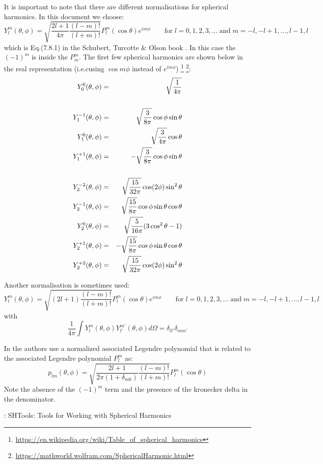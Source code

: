 It is important to note that there are different normalisations for spherical harmonics.
In this document we choose:
\begin{equation}
\boxed{
Y_l^m(\theta,\phi) = \sqrt{\frac{2l+1}{4\pi} \frac{(l-m)!}{(l+m)!}} P_l^m(\cos\theta) e^{im\phi}
}
\qquad 
\textrm{for} \; l=0,1,2,3,... \; \textrm{and} \; m=-l,-l+1,...,l-1,l
\label{eq:spha6}
\end{equation}
which is Eq.(7.8.1) in the Schubert, Turcotte \& Olson book \cite{scto01}. 
In this case the $(-1)^m$ is inside the $P_m^m$.
The first few spherical harmonics are shown below in the real representation (i.e.cusing $\cos m\phi$  instead of $e^{i m \phi}$) \footnote{\url{https://en.wikipedia.org/wiki/Table_of_spherical_harmonics}} \footnote{\url{https://mathworld.wolfram.com/SphericalHarmonic.html}}:
\begin{eqnarray}
Y_0^0(\theta,\phi)    &=& \sqrt{\frac{1}{4\pi}} \nonumber\\ \nonumber\\
Y_1^{-1}(\theta,\phi) &=& \sqrt{\frac{3}{8\pi}} \cos\phi\sin\theta\nonumber\\
Y_1^{0 }(\theta,\phi) &=& \sqrt{\frac{3}{4\pi}} \cos\theta \nonumber\\
Y_1^{+1}(\theta,\phi) &=& -\sqrt{\frac{3}{8\pi}} \cos\phi\sin\theta \nonumber\\ \nonumber\\
Y_2^{-2}(\theta,\phi) &=& \sqrt{\frac{15}{32\pi}} \cos(2\phi) \sin^2\theta \nonumber\\ 
Y_2^{-1}(\theta,\phi) &=& \sqrt{\frac{15}{8\pi}} \cos\phi \sin\theta\cos\theta \nonumber\\ 
Y_2^{ 0}(\theta,\phi) &=& \sqrt{\frac{5}{16\pi}} (3\cos^2\theta -1) \nonumber\\
Y_2^{+1}(\theta,\phi) &=& -\sqrt{\frac{15}{8\pi}} \cos\phi \sin\theta\cos\theta \nonumber\\
Y_2^{+2}(\theta,\phi) &=& \sqrt{\frac{15}{32\pi}} \cos(2\phi) \sin^2\theta \nonumber
\end{eqnarray}


Another normalisation is sometimes used:  
\begin{equation}
Y_l^m(\theta,\phi) = \sqrt{(2l+1) \frac{(l-m)!}{(l+m)!}} P_l^m(\cos\theta) e^{im\phi}
\qquad 
\textrm{for} \; l=0,1,2,3,... \; \textrm{and} \; m=-l,-l+1,...,l-1,l
\label{eq:spha7}
\end{equation}
with
\[
\frac{1}{4\pi}
\int Y_l^m(\theta,\phi) Y_{l'}^{m'}(\theta,\phi) d\Omega = \delta_{ll'} \delta_{mm'}
\]





\begin{remark}
In \cite{zhmt08} the authors use a normalized associated Legendre
polynomial that is related to the associated Legendre polynomial $P_l^m$ as:
\[
p_{lm}(\theta,\phi) = \sqrt{\frac{2l+1}{2\pi(1+\delta_{m0})} \frac{(l-m)!}{(l+m)!}} P_l^m(\cos\theta)
\]
Note the absence of the $(-1)^m$ term and the presence of the kronecker delta in the denominator.
\end{remark}



\Literature: SHTools: Tools for Working with Spherical Harmonics \cite{wime18}
